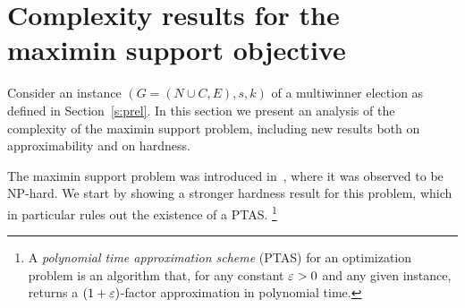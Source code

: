 \section{Complexity results for the maximin support objective}\label{s:complexity}

Consider an instance $(G=(N\cup C, E), s, k)$ of a multiwinner election as defined in Section~\ref{s:prel}. 
In this section we present an analysis of the complexity of the maximin support problem, including new results both on approximability and on hardness. 

The maximin support problem was introduced in~\cite{sanchez2016maximin}, where it was observed to be NP-hard. We start by showing a stronger hardness result for this problem, which in particular rules out the existence of a PTAS.%
\footnote{A \emph{polynomial time approximation scheme} (PTAS) for an optimization problem is an algorithm that, for any constant $\varepsilon>0$ and any given instance, returns a $(1+\varepsilon)$-factor approximation in polynomial time.} 


